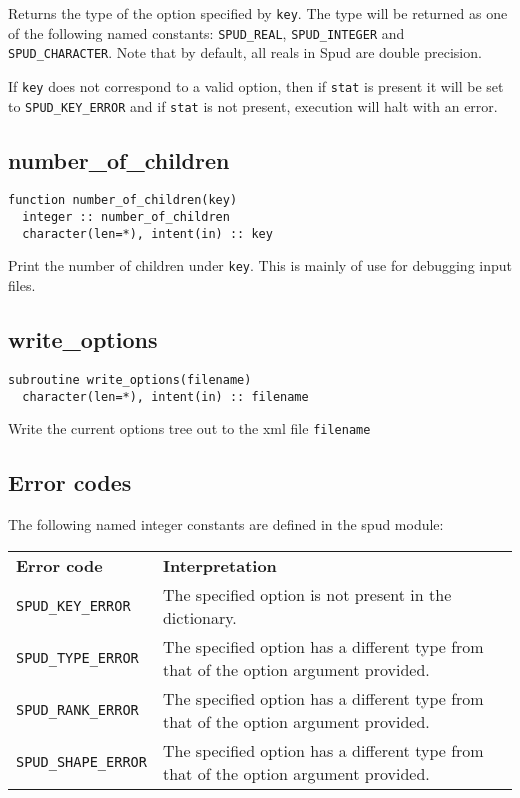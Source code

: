 \documentclass[a4paper, 11pt]{book}
\begin{document}
Returns the type of the option specified by \lstinline+key+. The type will
be returned as one of the following named constants: 
\lstinline+SPUD_REAL+, \lstinline+SPUD_INTEGER+ and
\lstinline+SPUD_CHARACTER+. Note that by default, all reals in Spud are
double precision.

If \lstinline+key+ does not correspond to a valid option, then if
\lstinline+stat+ is present it will be set to \lstinline+SPUD_KEY_ERROR+ and
if \lstinline+stat+ is not present, execution will halt with an error.

\subsection{number\_of\_children}

\begin{lstlisting}
function number_of_children(key)
  integer :: number_of_children
  character(len=*), intent(in) :: key
\end{lstlisting}

Print the number of children under \lstinline+key+. This is mainly of use
for debugging input files.

\subsection{write\_options}

\begin{lstlisting}
subroutine write_options(filename) 
  character(len=*), intent(in) :: filename
\end{lstlisting}

Write the current options tree out to the xml file \lstinline+filename+

\subsection{Error codes}\label{sec:fortran_error}

The following named integer constants are defined in the spud module:

\begin{tabular}{lp{10cm}}
  \textbf{Error code} & \textbf{Interpretation}\\
  \lstinline+SPUD_KEY_ERROR+ & The specified option is not present in the
  dictionary.\\
  \lstinline+SPUD_TYPE_ERROR+ & The specified option has a different type
  from that of the option argument provided.\\
  \lstinline+SPUD_RANK_ERROR+ & The specified option has a different type
  from that of the option argument provided.\\
  \lstinline+SPUD_SHAPE_ERROR+ & The specified option has a different type
  from that of the option argument provided.
\end{tabular}
\end{document}
